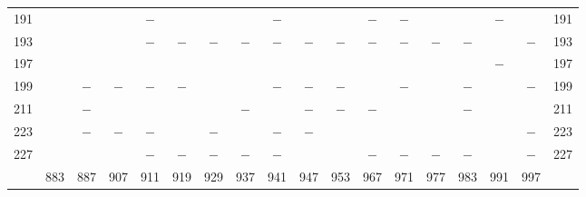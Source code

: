 \begin{center}
\begin{tabular}{r|c|c|c|c|c|c|c|c|c|c|c|c|c|c|c|c|r}
191 &  &  &  & $-$ &  &  &  & $-$ &  &  & $-$ & $-$ &  &  & $-$ &  & 191\\
193 &  &  &  & $-$ & $-$ & $-$ & $-$ & $-$ & $-$ & $-$ & $-$ & $-$ & $-$ & $-$ &  & $-$ & 193\\
197 &  &  &  &  &  &  &  &  &  &  &  &  &  &  & $-$ &  & 197\\
199 &  & $-$ & $-$ & $-$ & $-$ &  &  & $-$ & $-$ & $-$ &  & $-$ &  & $-$ &  & $-$ & 199\\
211 &  & $-$ &  &  &  &  & $-$ &  & $-$ & $-$ & $-$ &  &  & $-$ &  &  & 211\\
223 &  & $-$ & $-$ & $-$ &  & $-$ &  & $-$ & $-$ &  &  &  &  &  &  & $-$ & 223\\
227 &  &  &  & $-$ & $-$ & $-$ & $-$ & $-$ &  &  & $-$ & $-$ & $-$ & $-$ &  & $-$ & 227\\
\hline
 & 883 & 887 & 907 & 911 & 919 & 929 & 937 & 941 & 947 & 953 & 967 & 971 & 977 & 983 & 991 & 997 & \\
\hline
\end{tabular}\endgroup\end{center}

